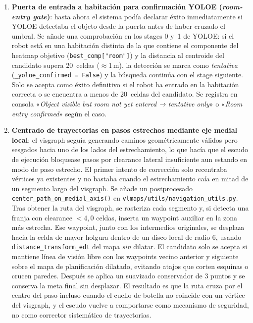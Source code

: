 \documentclass[11pt,a4paper]{article}
\begin{document}
\begin{enumerate}
  \item \textbf{Puerta de entrada a habitación para confirmación YOLOE (\textit{room-entry gate})}: hasta ahora el sistema podía declarar éxito
        inmediatamente si YOLOE detectaba el objeto desde la puerta antes de
        haber cruzado el umbral. Se añade una comprobación en los stages 0
        y~1 de YOLOE: si el robot está en una habitación distinta de la que
        contiene el componente del heatmap objetivo
        (\texttt{best\_comp["room"]}) y la distancia al centroide del
        candidato supera 20~celdas ($\approx$1\,m), la detección se marca
        como \textit{tentativa} (\texttt{\_yoloe\_confirmed = False}) y la
        búsqueda continúa con el stage siguiente. Solo se acepta como éxito
        definitivo si el robot ha entrado en la habitación correcta o se
        encuentra a menos de 20~celdas del candidato. Se registra en consola
        «\textit{Object visible but room not yet entered → tentative only}» o
        «\textit{Room entry confirmed}» según el caso.

  \item \textbf{Centrado de trayectorias en pasos estrechos mediante eje medial local}:
        el visgraph seguía generando caminos geométricamente válidos pero
        sesgados hacia uno de los lados del estrechamiento, lo que hacía que el
        escudo de ejecución bloquease pasos por clearance lateral insuficiente
        aun estando en modo de paso estrecho. El primer intento de corrección
        solo recentraba vértices ya existentes y no bastaba cuando el
        estrechamiento caía en mitad de un segmento largo del visgraph. Se
        añade un postprocesado
        \texttt{center\_path\_on\_medial\_axis()} en
        \texttt{vlmaps/utils/navigation\_utils.py}. Tras obtener la ruta del
        visgraph, se rasteriza cada segmento y, si detecta una franja con
        clearance $<4{,}0$ celdas, inserta un waypoint auxiliar en la zona más
        estrecha. Ese waypoint, junto con los intermedios originales, se
        desplaza hacia la celda de mayor holgura dentro de un disco local de
        radio 6, usando \texttt{distance\_transform\_edt} del mapa
        \emph{sin} dilatar. El candidato solo se acepta si mantiene línea de
        visión libre con los waypoints vecino anterior y siguiente sobre el
        mapa de planificación dilatado, evitando atajos que corten esquinas o
        crucen paredes. Después se aplica un suavizado conservador de 3 puntos
        y se conserva la meta final sin desplazar. El resultado es que la ruta
        cruza por el centro del paso incluso cuando el cuello de botella no
        coincide con un vértice del visgraph, y el escudo vuelve a comportarse
        como mecanismo de seguridad, no como corrector sistemático de
        trayectorias.


\end{enumerate}
\end{document}
